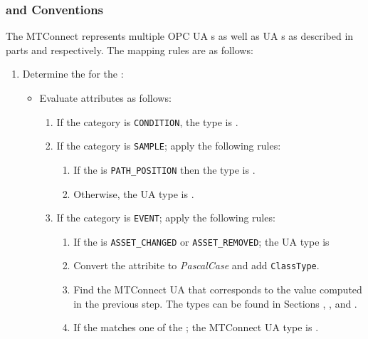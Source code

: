 \subsubsection{  and  Conventions}

The MTConnect  represents multiple OPC UA s as well as UA s as described in parts \cite{UAPart8} and \cite{UAPart9} respectively. The mapping rules are as follows:

\begin{enumerate}
\item Determine the   for the  :
    \begin{itemize}
    \item Evaluate  attributes as follows:
        \begin{enumerate}
        \item If the category is \texttt{CONDITION}, the type is .
        \item If the category is \texttt{SAMPLE}; apply the following rules:
            \begin{enumerate}
            \item If the  is \texttt{PATH_POSITION} then the type is .
            \item Otherwise, the UA type is .
            \end{enumerate}
        \item If the category is \texttt{EVENT}; apply the following rules:
            \begin{enumerate}
            \item If the  is \texttt{ASSET_CHANGED} or \texttt{ASSET_REMOVED}; the UA type is 
            \item Convert the  attribite to \textit{PascalCase} and add \texttt{ClassType}.
            \item Find the MTConnect UA  that corresponds to the value computed in the previous step.
            The types can be found in Sections , , and .
            \item If the  matches one of the ; the MTConnect UA type is .

\end{enumerate}
\end{enumerate}
\end{itemize}
\end{enumerate}
